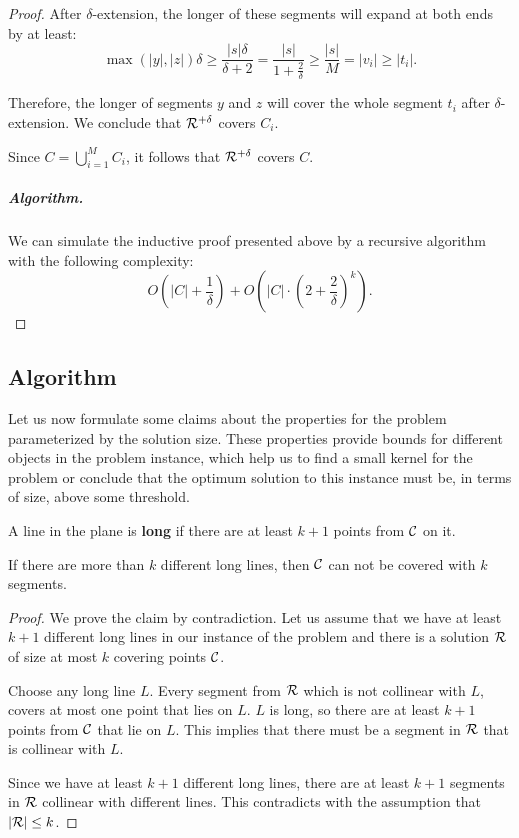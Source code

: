 \begin{proof}
After $\delta$-extension, the longer of these segments will
expand at both ends by at least:
$$\max(|y|, |z|)\delta \ge \frac{|s|\delta}{\delta+2} =
\frac{|s|}{1+\frac{2}{\delta}} \ge \frac{|s|}{M} = |v_i| \ge |t_i|.$$

Therefore, the longer of segments $y$ and $z$ will cover the whole segment $t_i$
after $\delta$-extension. We conclude that $\mathcal{R}^{+\delta}$ covers $C_i$.

Since $C = \bigcup_{i=1}^M C_i$,
it follows that $\mathcal{R}^{+\delta}$ covers $C$.


\subparagraph{Algorithm.}

We can simulate the inductive proof presented above by a recursive algorithm with
the following complexity:
$$O\left(|C|+\frac{1}{\delta}\right) + O\left(|C|\cdot\left(2+\frac{2}{\delta}\right)^k\right).$$

\end{proof}

\subsection{Algorithm}

Let us now formulate some claims about the
properties for the problem parameterized by the solution size.
These properties provide bounds for different
objects in the problem instance,
which help us to find a small kernel for the problem
or conclude that the optimum
solution to this instance must be, in terms of size, above some threshold.

\begin{defi}
A line in the plane is \textbf{long}
if there are at least $k+1$ points from $\mathcal{C}$ on it.
\end{defi}

\begin{claim}
\label{few_long_lines}
If there are more than $k$ different long lines, then 
$\mathcal{C}$ can not be covered with $k$ segments.
\end{claim}

\begin{proof}
We prove the claim by contradiction.
Let us assume that we have at least $k+1$ different
long lines in our instance of the problem
and there is a solution $\mathcal{R}$ of size at most $k$
covering points $\mathcal{C}$.

Choose any long line $L$.
Every segment from $\mathcal{R}$ which is not collinear with $L$,
covers at most one point that lies on $L$.
$L$ is long, so there are at least $k+1$ points from $\mathcal{C}$ that lie on $L$.
This implies that there must be a segment in $\mathcal{R}$ that is
collinear with $L$.

Since we have at least $k+1$ different long lines,
there are at least $k+1$
segments in $\mathcal{R}$ collinear with different lines.
This contradicts with the assumption that $|\mathcal{R}| \le k$.
\end{proof}

